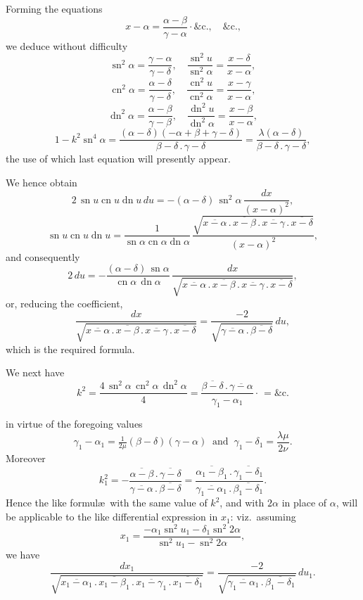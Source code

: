 \documentclass[11pt,a4paper]{article}
\providecommand{\sn}{\operatorname{sn}}
\providecommand{\cn}{\operatorname{cn}}
\providecommand{\dn}{\operatorname{dn}}
\begin{document}
Forming the equations
\[
x - \alpha = \frac{\alpha - \beta}{\gamma - \alpha}\cdot \&\text{c.}, \quad \&\text{c.,}
\]
we deduce without difficulty
\[
\sn^{2}\alpha = \frac{\gamma - \alpha}{\gamma - \delta}, \quad \frac{\sn^{2} u}{\sn^{2}\alpha} = \frac{x - \delta}{x - \alpha},
\]
\[
\cn^{2}\alpha = \frac{\alpha - \delta}{\gamma - \delta}, \quad \frac{\cn^{2} u}{\cn^{2}\alpha} = \frac{x - \gamma}{x - \alpha},
\]
\[
\dn^{2}\alpha = \frac{\alpha - \beta}{\gamma - \beta}, \quad \frac{\dn^{2} u}{\dn^{2}\alpha} = \frac{x - \beta}{x - \alpha},
\]
\[
1 - k^{2}\sn^{4}\alpha = \frac{(\alpha - \delta)(-\alpha + \beta + \gamma - \delta)}{\beta - \delta\,.\,\gamma - \delta} = \frac{\lambda(\alpha - \delta)}{\beta - \delta\,.\,\gamma - \delta},
\]
the use of which last equation will presently appear.

We hence obtain
\[
2\,\sn u \cn u \dn u \, du = -(\alpha - \delta)\,\sn^{2}\alpha\,\frac{dx}{(x - \alpha)^{2}},
\]
\[
\sn u \cn u \dn u = \frac{1}{\sn\alpha \cn\alpha \dn\alpha}\,\frac{\sqrt{\overline{x - \alpha}\,.\,\overline{x - \beta}\,.\,\overline{x - \gamma}\,.\,\overline{x - \delta}}}{(x - \alpha)^{2}},
\]
and consequently
\[
2\,du = -\frac{(\alpha - \delta)\,\sn\alpha}{\cn\alpha\,\dn\alpha}\,\frac{dx}{\sqrt{\overline{x - \alpha}\,.\,\overline{x - \beta}\,.\,\overline{x - \gamma}\,.\,\overline{x - \delta}}},
\]
or, reducing the coefficient,
\[
\frac{dx}{\sqrt{\overline{x - \alpha}\,.\,\overline{x - \beta}\,.\,\overline{x - \gamma}\,.\,\overline{x - \delta}}} = \frac{-2}{\sqrt{\overline{\gamma - \alpha}\,.\,\overline{\beta - \delta}}}\,du,
\]
which is the required formula.

We next have
\[
k^{2} = \frac{4\,\sn^{2}\alpha\,\cn^{2}\alpha\,\dn^{2}\alpha}{4} = \frac{\overline{\beta - \delta}\,.\,\overline{\gamma - \alpha}}{\gamma_{1} - \alpha_{1}}\cdot\frac{}{} = \&\text{c.}
\]

\newpage


in virtue of the foregoing values
\[
\gamma_{1} - \alpha_{1} = \tfrac{1}{2\mu}(\beta - \delta)(\gamma - \alpha) \;\;\text{and}\;\; \gamma_{1} - \delta_{1} = \frac{\lambda\mu}{2\nu}.
\]
Moreover
\[
k_{1}^{2} = -\frac{\overline{\alpha - \beta}\,.\,\overline{\gamma - \delta}}{\overline{\gamma - \alpha}\,.\,\overline{\beta - \delta}} = \frac{\overline{\alpha_{1} - \beta_{1}}\,.\,\overline{\gamma_{1} - \delta_{1}}}{\overline{\gamma_{1} - \alpha_{1}}\,.\,\overline{\beta_{1} - \delta_{1}}}.
\]
Hence the like formul\ae\ with the same value of $k^{2}$, and with $2\alpha$ in place of $\alpha$, will be applicable to the like differential expression in $x_{1}$: viz.\ assuming
\[
x_{1} = \frac{-\alpha_{1}\sn^{2} u_{1} - \delta_{1}\sn^{2} 2\alpha}{\sn^{2} u_{1} - \sn^{2} 2\alpha},
\]
we have
\[
\frac{dx_{1}}{\sqrt{\overline{x_{1} - \alpha_{1}}\,.\,\overline{x_{1} - \beta_{1}}\,.\,\overline{x_{1} - \gamma_{1}}\,.\,\overline{x_{1} - \delta_{1}}}} = \frac{-2}{\sqrt{\overline{\gamma_{1} - \alpha_{1}}\,.\,\overline{\beta_{1} - \delta_{1}}}}\,du_{1}.
\]
\end{document}
